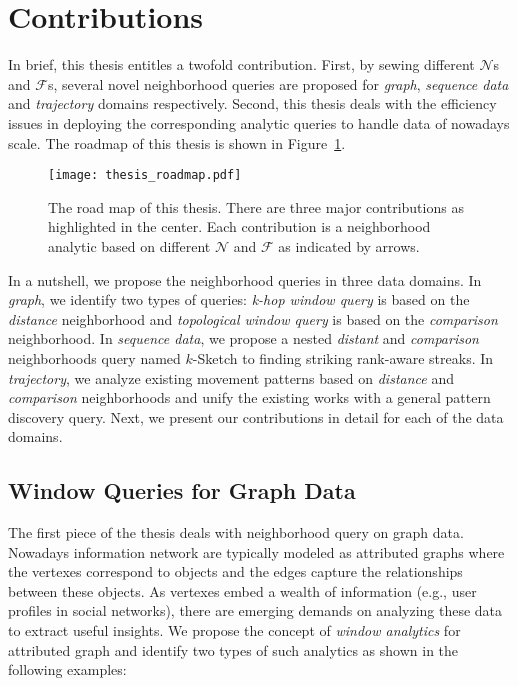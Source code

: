 \section{Contributions}
In brief, this thesis entitles a twofold contribution.
First, by sewing different $\mathcal{N}$s and $\mathcal{F}$s, 
several novel neighborhood queries are proposed for 
\emph{graph}, \emph{sequence data} and \emph{trajectory} domains respectively. 
Second, this thesis
deals with the efficiency issues in deploying the corresponding analytic queries to
handle data of nowadays scale.
The roadmap of this thesis is shown in Figure~\ref{fig:thesis_roadmap}.
\begin{figure}[h]
\centering
\texttt{[image: thesis\_roadmap.pdf]}
\caption{The road map of this thesis. There are three major contributions as highlighted in the center. Each contribution
is a neighborhood analytic based on different $\mathcal{N}$ and $\mathcal{F}$ as indicated by arrows.} 
\label{fig:thesis_roadmap}
\end{figure}

In a nutshell, we propose the neighborhood queries in three data domains. 
In \emph{graph}, we identify two types of queries: \emph{k-hop window query} is based on the \emph{distance} neighborhood
and \emph{topological window query} is based on the \emph{comparison} neighborhood. 
In \emph{sequence data}, we propose a nested \emph{distant} and \emph{comparison} neighborhoods
query named $k$-Sketch to finding striking rank-aware streaks.
In \emph{trajectory}, we analyze existing movement patterns based
on \emph{distance} and \emph{comparison} neighborhoods and unify
the existing works with a general pattern discovery query. Next, we present our contributions in detail for each of the data domains.


\subsection{Window Queries for Graph Data}
The first piece of the thesis deals with neighborhood query
on graph data. Nowadays information network are typically
modeled as attributed graphs where the 
vertexes correspond to objects and the edges capture the
relationships between these objects. As vertexes embed a wealth
of information (e.g., user profiles in social networks), there are 
emerging demands on analyzing these data to extract useful insights. 
We propose the concept of \emph{window analytics} 
for attributed graph and identify two types of such analytics as shown in the following examples:

